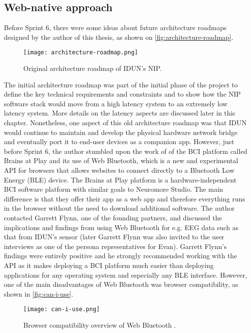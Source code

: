 \subsection{Web-native approach}
\label{chapter4-web-first-approach}

Before Sprint 6, there were some ideas about future architecture roadmaps designed by the author of this thesis, as shown on \autoref{fig:architecture-roadmap}.

\begin{figure}[!ht]
  \centering
  \texttt{[image: architecture-roadmap.png]}
  \caption{Original architecture roadmap of IDUN's NIP.}
  \label{fig:architecture-roadmap}
\end{figure}

The initial architecture roadmap was part of the initial phase of the project to define the key technical requirements and constraints and to show how the NIP software stack would move from a high latency system to an extremely low latency system. More details on the latency aspects are discussed later in this chapter. Nonetheless, one aspect of this old architecture roadmap was that IDUN would continue to maintain and develop the physical hardware network bridge and eventually port it to end-user devices as a companion app. However, just before Sprint 6, the author stumbled upon the work of \citeauthor{flynn_brainsplay_nodate} of the BCI platform called Brains at Play and its use of Web Bluetooth, which is a new and experimental API for browsers that allows websites to connect directly to a Bluetooth Low Energy (BLE) device. The Brains at Play platform is a hardware-independent BCI software platform with similar goals to Neuromore Studio. The main difference is that they offer their app as a web app and therefore everything runs in the browser without the need to download additional software. The author contacted Garrett Flynn, one of the founding partners, and discussed the implications and findings from using Web Bluetooth for e.g. EEG data such as that from IDUN's sensor (later Garrett Flynn was also invited to the user interviews as one of the persona representatives for Evan). Garrett Flynn's findings were entirely positive and he strongly recommended working with the API as it makes deploying a BCI platform much easier than deploying applications for any operating system and especially any BLE interface. However, one of the main disadvantages of Web Bluetooth was browser compatibility, as shown in \autoref{fig:can-i-use}.

\begin{figure}[!ht]
  \centering
  \texttt{[image: can-i-use.png]}
  \caption{Browser compatibility overview of Web Bluetooth \citep{caniuse_web_nodate}.}
  \label{fig:can-i-use}
\end{figure}

